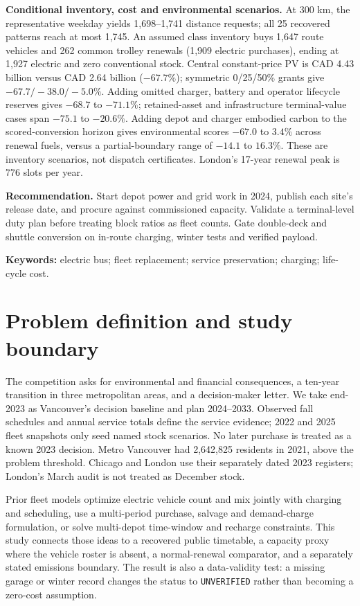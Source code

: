 \documentclass[12pt,letterpaper]{article}
\begin{document}
\textbf{Conditional inventory, cost and environmental scenarios.} At 300 km, the representative weekday yields 1,698--1,741 distance requests; all 25 recovered patterns reach at most 1,745. An assumed class inventory buys 1,647 route vehicles and 262 common trolley renewals (1,909 electric purchases), ending at 1,927 electric and zero conventional stock. Central constant-price PV is CAD 4.43 billion versus CAD 2.64 billion ($-67.7\%$); symmetric 0/25/50\% grants give $-67.7/-38.0/-5.0\%$. Adding omitted charger, battery and operator lifecycle reserves gives $-68.7$ to $-71.1\%$; retained-asset and infrastructure terminal-value cases span $-75.1$ to $-20.6\%$. Adding depot and charger embodied carbon to the scored-conversion horizon gives environmental scores $-67.0$ to $3.4\%$ across renewal fuels, versus a partial-boundary range of $-14.1$ to $16.3\%$. These are inventory scenarios, not dispatch certificates. London's 17-year renewal peak is 776 slots per year.\cite{fleet2020,playbook2024,budget2025,foothill2024,endera2023,zhao2022,yeboah2025}

\textbf{Recommendation.} Start depot power and grid work in 2024, publish each site's release date, and procure against commissioned capacity. Validate a terminal-level duty plan before treating block ratios as fleet counts. Gate double-deck and shuttle conversion on in-route charging, winter tests and verified payload.

\textbf{Keywords:} electric bus; fleet replacement; service preservation; charging; life-cycle cost.
\newpage
\tableofcontents


\section{Problem definition and study boundary}
The competition asks for environmental and financial consequences, a ten-year transition in three metropolitan areas, and a decision-maker letter.\cite{problem} We take end-2023 as Vancouver's decision baseline and plan 2024--2033. Observed fall schedules and annual service totals define the service evidence; 2022 and 2025 fleet snapshots only seed named stock scenarios. No later purchase is treated as a known 2023 decision. Metro Vancouver had 2,642,825 residents in 2021, above the problem threshold.\cite{vancouvercensus} Chicago and London use their separately dated 2023 registers; London's March audit is not treated as December stock.

Prior fleet models optimize electric vehicle count and mix jointly with charging and scheduling,\cite{rogge} use a multi-period purchase, salvage and demand-charge formulation,\cite{pelletier} or solve multi-depot time-window and recharge constraints.\cite{gkiotsalitis} This study connects those ideas to a recovered public timetable, a capacity proxy where the vehicle roster is absent, a normal-renewal comparator, and a separately stated emissions boundary. The result is also a data-validity test: a missing garage or winter record changes the status to \texttt{UNVERIFIED} rather than becoming a zero-cost assumption.
\end{document}
